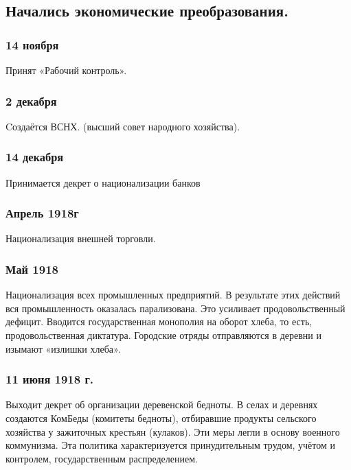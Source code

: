 \subsection{Начались экономические преобразования.}

\subsubsection{\textbf{14 ноября}}

Принят «Рабочий контроль».

\subsubsection{\textbf{2 декабря}}

Cоздаётся ВСНХ. (высший совет народного хозяйства).

\subsubsection{\textbf{14 декабря}}

Принимается декрет о национализации банков

\subsubsection{\textbf{Апрель 1918г}}

Национализация внешней торговли.

\subsubsection{\textbf{Май 1918}}

Национализация всех промышленных предприятий. В результате этих действий вся промышленность оказалась парализована. Это усиливает продовольственный дефицит. Вводится государственная монополия на оборот хлеба, то есть, продовольственная диктатура. Городские отряды отправляются в деревни и изымают «излишки хлеба».

\subsubsection{\textbf{11 июня 1918 г.}}

Выходит декрет об организации деревенской бедноты. В селах и деревнях создаются КомБеды (комитеты бедноты), отбиравшие продукты сельского хозяйства у зажиточных крестьян (кулаков). Эти меры легли в основу военного коммунизма. Эта политика характеризуется принудительным трудом, учётом и контролем, государственным распределением.

